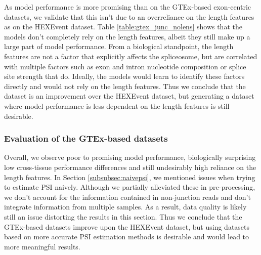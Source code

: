 As model performance is more promising than on the GTEx-based exon-centric datasets, we validate that this isn't due to an overreliance on the length features as on the HEXEvent dataset. Table \ref{table:gtex_junc_nolens} shows that the models don't completely rely on the length features, albeit they still make up a large part of model performance. From a biological standpoint, the length features are not a factor that explicitly affects the spliceosome, but are correlated with multiple factors such as exon and intron nucleotide composition \cite{lengthsnucleotidecom} or splice site strength \cite{lengthsref2} that do. Ideally, the models would learn to identify these factors directly and would not rely on the length features. Thus we conclude that the dataset is an improvement over the HEXEvent dataset, but generating a dataset where model performance is less dependent on the length features is still desirable. 






\subsubsection{Evaluation of the GTEx-based datasets}
Overall, we observe poor to promising model performance, biologically surprising low cross-tissue performance differences and still undesirably high reliance on the length features. 
In Section \ref{subsubsec:naivepsi}, we mentioned issues when trying to estimate PSI naively. Although we partially alleviated these in pre-processing, we don't account for the information contained in non-junction reads and don't integrate information from multiple samples. As a result, data quality is likely still an issue distorting the results in this section. 
Thus we conclude that the GTEx-based datasets improve upon the HEXEvent dataset, but using datasets based on more accurate PSI estimation methods is desirable and would lead to more meaningful results. %

